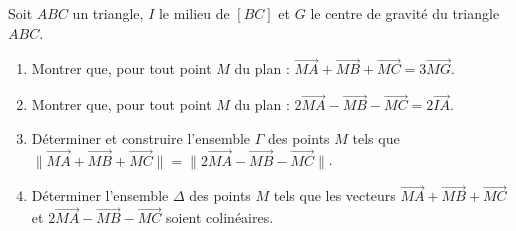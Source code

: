 
\newcommand{\R}{\mathbb{R}}
\newcommand{\vect}[1]{\overrightarrow{#1}}

Soit $ABC$ un triangle, $I$ le milieu de $[BC]$ et $G$ le centre de gravité du triangle $ABC$.
\begin{enumerate}
  \item Montrer que, pour tout point $M$ du plan : $\vect{MA}+\vect{MB}+\vect{MC}=3\vect{MG}$.
  \item Montrer que, pour tout point $M$ du plan : $2\vect{MA}-\vect{MB}-\vect{MC}=2\vect{IA}$.
  \item Déterminer et construire l'ensemble $\Gamma$ des points $M$ tels que $\bigl\|\vect{MA}+\vect{MB}+\vect{MC}\bigr\|=\bigl\|2\vect{MA}-\vect{MB}-\vect{MC}\bigr\|$.
  \item Déterminer l'ensemble $\Delta$ des points $M$ tels que les vecteurs $\vect{MA}+\vect{MB}+\vect{MC}$ et $2\vect{MA}-\vect{MB}-\vect{MC}$ soient colinéaires.
\end{enumerate}

